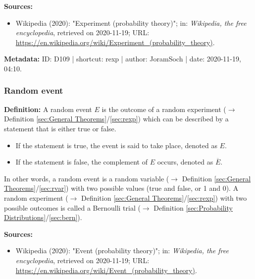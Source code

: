 \documentclass[a4paper,12pt,twoside]{book}
\begin{document}
\vspace{1em}
\textbf{Sources:}
\begin{itemize}
\item Wikipedia (2020): "Experiment (probability theory)"; in: \textit{Wikipedia, the free encyclopedia}, retrieved on 2020-11-19; URL: \url{https://en.wikipedia.org/wiki/Experiment_(probability_theory)}.
\end{itemize}


\vspace{1em}
\textbf{Metadata:} ID: D109 | shortcut: rexp | author: JoramSoch | date: 2020-11-19, 04:10.
\vspace{1em}



\subsubsection[\textit{Random event}]{Random event} \label{sec:reve}
\setcounter{equation}{0}

\textbf{Definition:} A random event $E$ is the outcome of a random experiment ($\rightarrow$ Definition \ref{sec:General Theorems}/\ref{sec:rexp}) which can be described by a statement that is either true or false.

\begin{itemize}

\item If the statement is true, the event is said to take place, denoted as $E$.

\item If the statement is false, the complement of $E$ occurs, denoted as $\overline{E}$.

\end{itemize}

In other words, a random event is a random variable ($\rightarrow$ Definition \ref{sec:General Theorems}/\ref{sec:rvar}) with two possible values (true and false, or 1 and 0). A random experiment ($\rightarrow$ Definition \ref{sec:General Theorems}/\ref{sec:rexp}) with two possible outcomes is called a Bernoulli trial ($\rightarrow$ Definition \ref{sec:Probability Distributions}/\ref{sec:bern}).


\vspace{1em}
\textbf{Sources:}
\begin{itemize}
\item Wikipedia (2020): "Event (probability theory)"; in: \textit{Wikipedia, the free encyclopedia}, retrieved on 2020-11-19; URL: \url{https://en.wikipedia.org/wiki/Event_(probability_theory)}.
\end{itemize}
\end{document}

